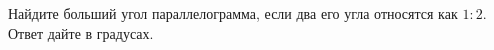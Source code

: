 \begin{ex}
	\begin{condition}
		Найдите больший угол параллелограмма, если два его угла относятся как \( 1 : 2 \). Ответ дайте в градусах.
	\end{condition}
\end{ex}